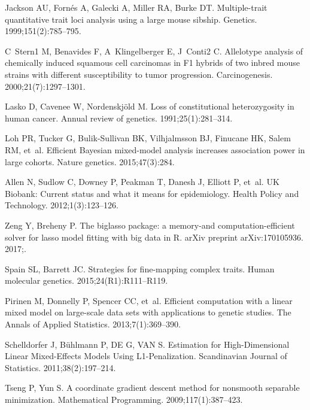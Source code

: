 \documentclass[10pt,letterpaper]{article}
\begin{document}
\begin{thebibliography}{10}
	Jackson AU, Forn{\'e}s A, Galecki A, Miller RA, Burke DT.
	\newblock Multiple-trait quantitative trait loci analysis using a large mouse
	sibship.
	\newblock Genetics. 1999;151(2):785--795.

	C~Stern1 M, Benavides F, A~Klingelberger E, J~Conti2 C.
	\newblock Allelotype analysis of chemically induced squamous cell carcinomas in
	F1 hybrids of two inbred mouse strains with different susceptibility to tumor
	progression.
	\newblock Carcinogenesis. 2000;21(7):1297--1301.

	Lasko D, Cavenee W, Nordenskj{\"o}ld M.
	\newblock Loss of constitutional heterozygosity in human cancer.
	\newblock Annual review of genetics. 1991;25(1):281--314.

	Loh PR, Tucker G, Bulik-Sullivan BK, Vilhjalmsson BJ, Finucane HK, Salem RM,
	et~al.
	\newblock Efficient Bayesian mixed-model analysis increases association power
	in large cohorts.
	\newblock Nature genetics. 2015;47(3):284.

	Allen N, Sudlow C, Downey P, Peakman T, Danesh J, Elliott P, et~al.
	\newblock UK Biobank: Current status and what it means for epidemiology.
	\newblock Health Policy and Technology. 2012;1(3):123--126.

	Zeng Y, Breheny P.
	\newblock The biglasso package: a memory-and computation-efficient solver for
	lasso model fitting with big data in R.
	\newblock arXiv preprint arXiv:170105936. 2017;.

	Spain SL, Barrett JC.
	\newblock Strategies for fine-mapping complex traits.
	\newblock Human molecular genetics. 2015;24(R1):R111--R119.

	Pirinen M, Donnelly P, Spencer CC, et~al.
	\newblock Efficient computation with a linear mixed model on large-scale data
	sets with applications to genetic studies.
	\newblock The Annals of Applied Statistics. 2013;7(1):369--390.

	Schelldorfer J, B{\"u}hlmann P, DE G, VAN S.
	\newblock Estimation for High-Dimensional Linear Mixed-Effects Models Using
	L1-Penalization.
	\newblock Scandinavian Journal of Statistics. 2011;38(2):197--214.

	Tseng P, Yun S.
	\newblock A coordinate gradient descent method for nonsmooth separable
	minimization.
	\newblock Mathematical Programming. 2009;117(1):387--423.


\end{thebibliography}
\end{document}
